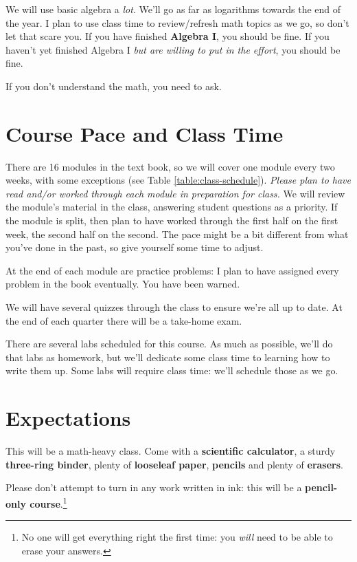 \documentclass[11pt, oneside]{article}   	%
\begin{document}
We will use basic algebra a \emph{lot}. 
We'll go as far as logarithms towards the end of the year.  
I plan to use class time to review/refresh math topics as we go, so don't let that scare you.
If you have finished \textbf{Algebra I}, you should be fine. 
If you haven't yet finished Algebra I \emph{but are willing to put in the effort}, you should be fine.

If you don't understand the math, you need to ask.

\section{Course Pace and Class Time}
There are 16 modules in the text book, so we will cover one module every two weeks, with some exceptions (see Table \ref{table:class-schedule}). \emph{Please plan to have read and/or worked through each module in preparation for class.}  We will review the module's material in the class, answering student questions as a priority. If the module is split, then plan to have worked through the first half on the first week, the second half on the second. The pace might be a bit different from what you've done in the past, so give yourself some time to adjust.

At the end of each module are practice problems: I plan to have assigned every problem in the book eventually. You have been warned.

We will have several quizzes through the class to ensure we're all up to date. At the end of each quarter there will be a take-home exam.

There are several labs scheduled for this course. As much as possible, we'll do that labs as homework, but we'll dedicate some class time to learning how to write them up.
Some labs will require class time: we'll schedule those as we go.

\section{Expectations}
This will be a math-heavy class. Come with a \textbf{scientific calculator}, a sturdy \textbf{three-ring binder}, plenty of \textbf{looseleaf paper}, \textbf{pencils} and plenty of \textbf{erasers}. 

Please don't attempt to turn in any work written in ink: this will be a \textbf{pencil-only course}.\footnote{No one will get everything right the first time: you \emph{will} need to be able to erase your answers.}
\end{document}
